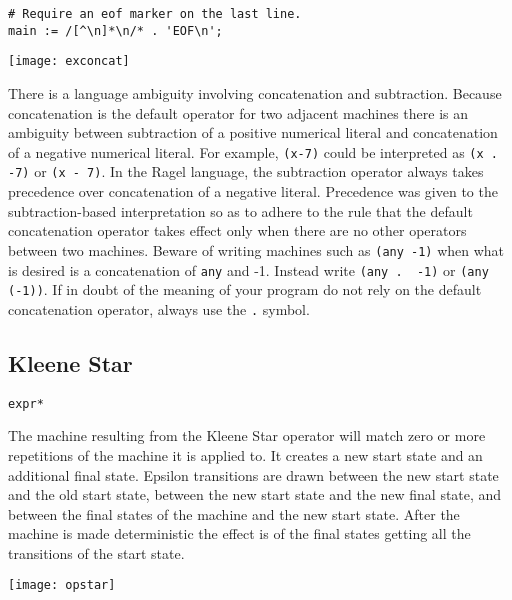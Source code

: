 \documentclass[letterpaper,11pt,oneside]{book}
\newcommand{\verbspace}{\vspace{10pt}}
\newcommand{\graphspace}{\vspace{10pt}}
\newenvironment{inline_code}{\def\baselinestretch{1}\vspace{12pt}\small}{}
\begin{document}
\begin{inline_code}
\begin{verbatim}
# Require an eof marker on the last line.
main := /[^\n]*\n/* . 'EOF\n';
\end{verbatim}
\end{inline_code}

\graphspace
\begin{center}
\texttt{[image: exconcat]}
\end{center}
\graphspace

 There is a language
ambiguity involving concatenation and subtraction. Because concatenation is the 
default operator for two
adjacent machines there is an ambiguity between subtraction of
a positive numerical literal and concatenation of a negative numerical literal.
For example, \verb|(x-7)| could be interpreted as \verb|(x . -7)| or 
\verb|(x - 7)|. In the Ragel language, the subtraction operator always takes precedence
over concatenation of a negative literal. Precedence was given to the
subtraction-based interpretation so as to adhere to the rule that the default
concatenation operator takes effect only when there are no other operators between
two machines. Beware of writing machines such as \verb|(any -1)| when what is
desired is a concatenation of \verb|any| and -1. Instead write 
\verb|(any .  -1)| or \verb|(any (-1))|. If in doubt of the meaning of your program do not
rely on the default concatenation operator, always use the \verb|.| symbol.


\subsection{Kleene Star}

\verb|expr*|
\verbspace

The machine resulting from the Kleene Star operator will match zero or more
repetitions of the machine it is applied to.
It creates a new start state and an additional final
state.  Epsilon transitions are drawn between the new start state and the old start
state, between the new start state and the new final state, and
between the final states of the machine and the new start state.  After the
machine is made deterministic the effect is of the final states getting all the
transitions of the start state. 

\graphspace
\begin{center}
\texttt{[image: opstar]}
\end{center}
\graphspace
\end{document}
